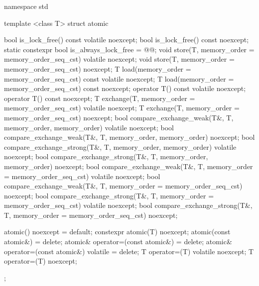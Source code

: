 \begin{codeblock}
namespace std {
  template <class T> struct atomic {
    bool is_lock_free() const volatile noexcept;
    bool is_lock_free() const noexcept;
    static constexpr bool is_always_lock_free = @\impdef{}@;
    void store(T, memory_order = memory_order_seq_cst) volatile noexcept;
    void store(T, memory_order = memory_order_seq_cst) noexcept;
    T load(memory_order = memory_order_seq_cst) const volatile noexcept;
    T load(memory_order = memory_order_seq_cst) const noexcept;
    operator T() const volatile noexcept;
    operator T() const noexcept;
    T exchange(T, memory_order = memory_order_seq_cst) volatile noexcept;
    T exchange(T, memory_order = memory_order_seq_cst) noexcept;
    bool compare_exchange_weak(T&, T, memory_order, memory_order) volatile noexcept;
    bool compare_exchange_weak(T&, T, memory_order, memory_order) noexcept;
    bool compare_exchange_strong(T&, T, memory_order, memory_order) volatile noexcept;
    bool compare_exchange_strong(T&, T, memory_order, memory_order) noexcept;
    bool compare_exchange_weak(T&, T, memory_order = memory_order_seq_cst) volatile noexcept;
    bool compare_exchange_weak(T&, T, memory_order = memory_order_seq_cst) noexcept;
    bool compare_exchange_strong(T&, T, memory_order = memory_order_seq_cst) volatile noexcept;
    bool compare_exchange_strong(T&, T, memory_order = memory_order_seq_cst) noexcept;

    atomic() noexcept = default;
    constexpr atomic(T) noexcept;
    atomic(const atomic&) = delete;
    atomic& operator=(const atomic&) = delete;
    atomic& operator=(const atomic&) volatile = delete;
    T operator=(T) volatile noexcept;
    T operator=(T) noexcept;
  };

}
\end{codeblock}

